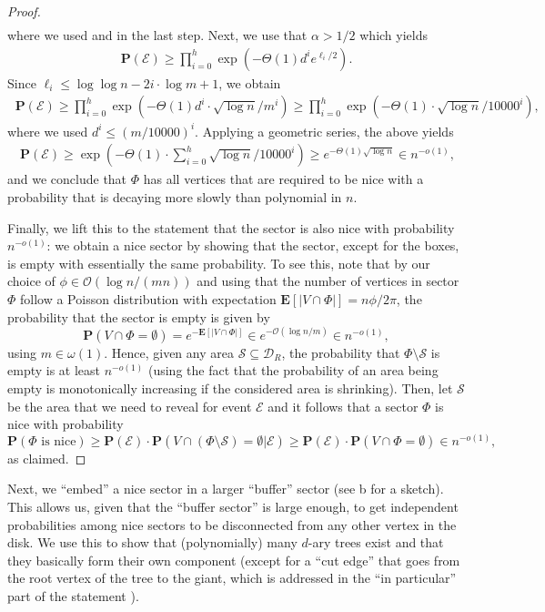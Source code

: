 \documentclass[letterpaper,11pt]{article}
\newcommand{\E}[1]{\mathbf{E}\left[#1\right]}
\newcommand{\Prob}[1]{\mathbf{P}\left(#1\right)}
\newcommand{\disk}{\ensuremath{\mathcal D_R}\xspace}
\newcommand{\1}{\mathbb I}
\newcommand{\bigO}{\mathcal{O}}
\begin{document}
\begin{proof}
\begin{align*}
\end{align*}
%
where we used  and  in the last step. Next, we use that $\alpha > 1/2$ which yields
\begin{align}\label{eq:probability-product}
  \Prob{\mathcal{E}}  \geq \prod_{i=0}^{h} \exp\left(-\Theta(1){d^i}{e^{\ell_i/2}}\right).
\end{align}
%
Since $\ell_i \leq \log\log n - 2i\cdot\log m + 1$, we obtain
%
\begin{align*}\
  \Prob{\mathcal{E}}  \geq \prod_{i=0}^{h} \exp\left(-\Theta(1){d^i}\cdot \sqrt{\log n}/m^i\right) \geq \prod_{i=0}^{h} \exp\left(-\Theta(1)\cdot \sqrt{\log n}/10000^i\right),
\end{align*}
where we used $d^i \leq (m/10000)^i$. Applying a geometric series, the above yields
\begin{align*}\
  \Prob{\mathcal{E}}  \geq \exp\left(-\Theta(1)\cdot\sum_{i=0}^{h} \sqrt{\log n}/10000^i\right) \geq e^{-\Theta(1)\sqrt{\log n}} \in n^{-o(1)},
\end{align*}
and we conclude that $\Phi$ has all vertices that are required to be nice with a probability that is decaying more slowly than polynomial in $n$. 

Finally, we lift this to the statement that the sector is also nice with probability $n^{-o(1)}$: we obtain a nice sector by showing that the sector, except for the boxes, is empty with essentially the same probability. To see this, note that by our choice of $\phi \in \bigO(\log n /(m n))$ and using that the number of vertices in sector $\Phi$ follow a Poisson distribution with expectation $\E{|V \cap \Phi|} = n \phi /2\pi$, the probability that the sector is empty is given by 
$$
\Prob{V \cap \Phi = \emptyset} = e^{-\E{|V \cap \Phi|}} \in e^{-\bigO(\log n /m)} \in n^{-o(1)},
$$
using $m \in \omega(1)$. Hence, given any area $\mathcal{S} \subseteq \disk$, the probability that $\Phi\setminus \mathcal{S}$ is empty is at least $n^{-o(1)}$ (using the fact that the probability of an area being empty is monotonically increasing if the considered area is shrinking). Then, let $\mathcal{S}$ be the area that we need to reveal for event $\mathcal{E}$ and it follows that a sector $\Phi$ is nice  with probability
$$\Prob{\Phi \text{ is nice}} \geq \Prob{\mathcal{E}}\cdot\Prob{V \cap (\Phi\setminus \mathcal{S}) = \emptyset | \mathcal{E}} \geq \Prob{\mathcal{E}}\cdot\Prob{V \cap \Phi = \emptyset}  \in n^{-o(1)},$$
as claimed.
\end{proof}
%
Next, we ``embed'' a nice sector in a larger ``buffer'' sector (see b for a sketch). This allows us, given that the ``buffer sector'' is large enough, to get independent probabilities among nice sectors to be disconnected from any other vertex in the disk. We use this to show that (polynomially) many $d$-ary trees exist and that they basically form their own component (except for a ``cut edge'' that goes from the root vertex of the tree to the giant, which is addressed in the ``in particular'' part of the statement ).
\end{document}
